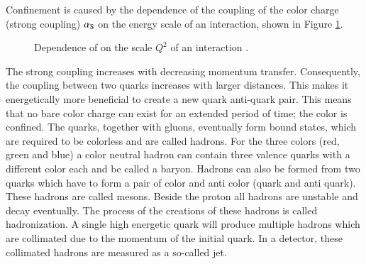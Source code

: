 Confinement is caused by the dependence of the coupling of the color charge (strong coupling) $\alpha_\mathrm{S}$ on the energy scale of an interaction, shown in Figure \ref{fig:theo_as}.

 
\begin{figure}[htbp!]
  \begin{center}
\caption{Dependence of \as on the scale $Q^2$ of an interaction \cite{Olive:2016xmw}.
  \label{fig:theo_as}}
  \end{center}
\end{figure}

The strong coupling increases with decreasing momentum transfer. Consequently, the coupling between two quarks increases with larger distances. This makes it energetically more beneficial to create a new quark anti-quark pair.
This means that no bare color charge can exist for an extended period of time; the color is confined. The quarks, together with gluons, eventually form bound states, which are required to be colorless and are called hadrons. 
For the three colors (red, green and blue) a color neutral hadron can contain three valence quarks with a different color each and be called a baryon. Hadrons can also be formed from two quarks which have to form a pair of color
and anti color (quark and anti quark). These hadrons are called mesons. Beside the proton all hadrons are unstable and decay eventually.
The process of the creations of these hadrons 
is called hadronization. A single high energetic quark will produce multiple hadrons which are collimated due to the momentum of the initial quark. In a detector, these collimated hadrons are measured as a so-called jet. 

